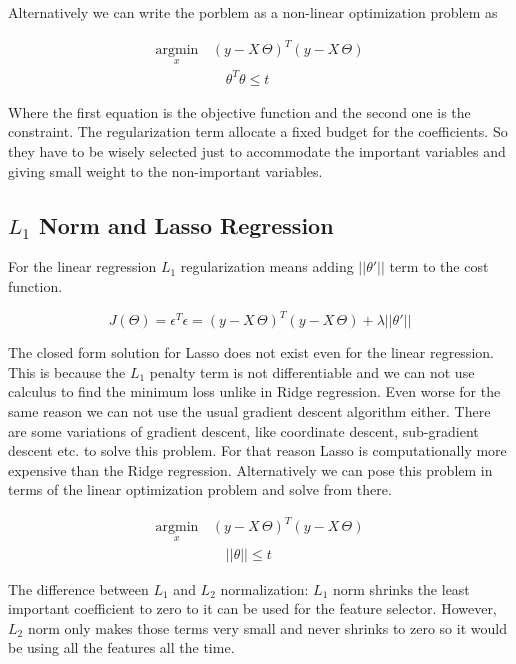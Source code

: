 \documentclass[11pt]{article}
\theoremstyle{definition}
\begin{document}
Alternatively we can write the porblem as a non-linear optimization problem as 

\begin{align*}
     \underset{x}{\mathrm{argmin}} \, & (y - X\, \Theta)^T (y - X\, \Theta) \\
    & \quad \theta^T\theta \leq t
\end{align*}

Where the first equation is the objective function and the second one is the constraint. The regularization term allocate a fixed budget for the coefficients. So they have to be wisely selected just to accommodate the important variables and giving small weight to the non-important variables. 





\subsection{$L_1$ Norm and Lasso Regression }


For the linear regression $L_1$ regularization means adding $||\theta'||$ term to the cost function. 

$$
J(\Theta) = \epsilon^T \epsilon = (y - X\, \Theta)^T (y - X\, \Theta) + \lambda ||\theta'||
$$

The closed form solution for Lasso does not exist even for the linear regression. This is because the $L_1$ penalty term is not differentiable and we can not use calculus to find the minimum loss unlike in Ridge regression. Even worse for the same reason we can not use the usual gradient descent algorithm either. There are some variations of gradient descent, like coordinate descent, sub-gradient descent etc. to solve this problem. For that reason Lasso is computationally more expensive than the Ridge regression. Alternatively we can pose this problem in terms of the linear optimization problem and solve from there.

\begin{align*}
     \underset{x}{\mathrm{argmin}} \, & (y - X\, \Theta)^T (y - X\, \Theta) \\
    & \quad ||\theta|| \leq t
\end{align*}


The difference between $L_1$ and $L_2$ normalization: $L_1$ norm shrinks the least important coefficient to zero to it can be used for the feature selector. However, $L_2$ norm only makes those terms very small and never shrinks to zero so it would be using all the features all the time. 
\end{document}
